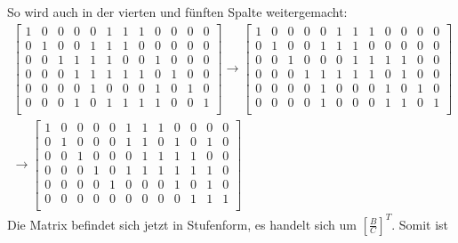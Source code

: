 \documentclass[a4paper,10pt,ngerman]{scrartcl}
\begin{document}
So wird auch in der vierten und fünften Spalte weitergemacht:
\begin{align*}
\left[ \begin{array}{cccccc|cccccc}
1 & 0 & 0 & 0 & 0 & 1 & 1 & 1 & 0 & 0 & 0 & 0 \\
0 & 1 & 0 & 0 & 1 & 1 & 1 & 0 & 0 & 0 & 0 & 0 \\
0 & 0 & 1 & 1 & 1 & 1 & 0 & 0 & 1 & 0 & 0 & 0 \\
0 & 0 & 0 & 1 & 1 & 1 & 1 & 1 & 0 & 1 & 0 & 0 \\
0 & 0 & 0 & 0 & 1 & 0 & 0 & 0 & 1 & 0 & 1 & 0 \\
0 & 0 & 0 & 1 & 0 & 1 & 1 & 1 & 1 & 0 & 0 & 1 \\
\end{array} \right]
\rightarrow \left[ \begin{array}{cccccc|cccccc}
1 & 0 & 0 & 0 & 0 & 1 & 1 & 1 & 0 & 0 & 0 & 0 \\
0 & 1 & 0 & 0 & 1 & 1 & 1 & 0 & 0 & 0 & 0 & 0 \\
0 & 0 & 1 & 0 & 0 & 0 & 1 & 1 & 1 & 1 & 0 & 0 \\
0 & 0 & 0 & 1 & 1 & 1 & 1 & 1 & 0 & 1 & 0 & 0 \\
0 & 0 & 0 & 0 & 1 & 0 & 0 & 0 & 1 & 0 & 1 & 0 \\
0 & 0 & 0 & 0 & 1 & 0 & 0 & 0 & 1 & 1 & 0 & 1 \\
\end{array} \right] \\
\rightarrow \left[ \begin{array}{cccccc|cccccc}
1 & 0 & 0 & 0 & 0 & 1 & 1 & 1 & 0 & 0 & 0 & 0 \\
0 & 1 & 0 & 0 & 0 & 1 & 1 & 0 & 1 & 0 & 1 & 0 \\
0 & 0 & 1 & 0 & 0 & 0 & 1 & 1 & 1 & 1 & 0 & 0 \\
0 & 0 & 0 & 1 & 0 & 1 & 1 & 1 & 1 & 1 & 1 & 0 \\
0 & 0 & 0 & 0 & 1 & 0 & 0 & 0 & 1 & 0 & 1 & 0 \\
0 & 0 & 0 & 0 & 0 & 0 & 0 & 0 & 0 & 1 & 1 & 1 \\
\end{array} \right]
\end{align*}
Die Matrix befindet sich jetzt in Stufenform, es handelt sich um $\left[\frac{B}{C}\right]^T$. Somit ist
\end{document}
